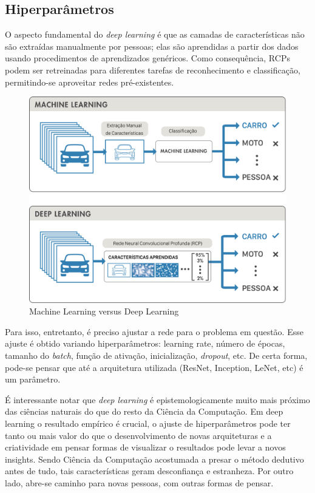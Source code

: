\documentclass[conference]{IEEEtran}
\begin{document}
\subsection{Hiperparâmetros}
O aspecto fundamental do \textit{deep learning} é que as camadas de características não são extraídas manualmente por pessoas; elas são aprendidas a partir dos dados usando procedimentos de aprendizados genéricos. Como consequência, RCPs podem ser retreinadas para diferentes tarefas de reconhecimento e classificação, permitindo-se aproveitar redes pré-existentes. 

\begin{figure}[ht!]
\begin{center}
\includegraphics[width=.65\columnwidth]{MLvsDL.png}
\caption{Machine Learning versus Deep Learning}
\end{center}
\end{figure}

Para isso, entretanto, é preciso ajustar a rede para o problema em questão. Esse ajuste é obtido variando hiperparâmetros: learning rate, número de épocas, tamanho do \textit{batch}, função de ativação, inicialização, \textit{dropout}, etc. De certa forma, pode-se pensar que até a arquitetura utilizada (ResNet, Inception, LeNet, etc) é um parâmetro.  

É interessante notar que \textit{deep learning} é epistemologicamente muito mais próximo das ciências naturais do que do resto da Ciência da Computação.  Em deep learning o resultado empírico é crucial, o ajuste de hiperparâmetros pode ter tanto ou mais valor do que o desenvolvimento de novas arquiteturas e a criatividade em pensar formas de visualizar o resultados pode levar a novos insights. Sendo Ciência da Computação acostumada a presar o método dedutivo antes de tudo, tais características geram desconfiança e estranheza.  Por outro lado, abre-se caminho para novas pessoas, com outras formas de pensar.
\end{document}
